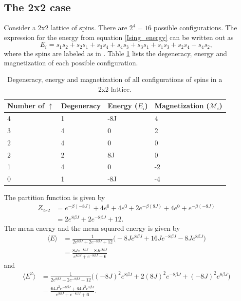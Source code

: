 \documentclass[notitlepage, reprint, nofootinbib]{revtex4-1}
\begin{document}
\subsection{The 2x2 case}
Consider a 2x2 lattice of spins. There are $2^4=16$ possible configurations. The expression for the energy from equation \ref{Ising_energy} can be written out as 
\begin{equation}\label{Ising_energy_2x2}E_i = s_1s_2+s_2s_1+s_3s_4+s_4s_3+s_3s_1+s_1s_3+s_2s_4+s_4s_2,\end{equation}
where the spins are labeled as in {\color{red}{figure}}. Table \ref{2x2_table} lists the degeneracy, energy and magnetization of each possible configuration. 
\begin{table}[]
\centering
\begin{tabular}{|l|l|l|l|}
\hline
Number of $\uparrow$ & Degeneracy & Energy ($E_i$) & Magnetization ($\mathcal{M}_i$) \\ \hline
4 & 1 & -8J & 4 \\ \hline
3 & 4 & 0 & 2 \\ \hline
2 & 4 & 0 & 0 \\ \hline
2 & 2 & 8J & 0 \\ \hline
1 & 4 & 0 & -2 \\ \hline
0 & 1 & -8J & -4 \\ \hline
\end{tabular}
\caption{Degeneracy, energy and magnetization of all configurations of spins in a 2x2 lattice.}
\label{2x2_table}
\end{table}
The partition function is given by 
\begin{align*}
	Z_{2x2}&=e^{-\beta(-8J)}+4e^0+4e^0+2e^{-\beta(8J)}+4e^0+e^{-\beta(-8J)}\\
	&= 2e^{8\beta J}+2e^{-8\beta J}+12.
\end{align*}
The mean energy and the mean squared energy is given by 
\begin{align*}
	\langle E\rangle&=\frac{1}{2e^{8\beta J}+2e^{-8\beta J}+12}\Big(-8Je^{8\beta J}+16Je^{-8\beta J}-8Je^{8\beta J}\Big)\\
	&=\frac{8Je^{-8\beta J} - 8Je^{8\beta J}}{e^{8\beta J}+e^{-8\beta J}+6}
\end{align*}
and 
\begin{align*}
	\langle E^2\rangle &=\frac{1}{2e^{8\beta J}+2e^{-8\beta J}+12}\Big((-8J)^2e^{8\beta J}+2(8J)^2e^{-8\beta J}+(-8J)^2e^{8\beta J}\Big)\\
	&=\frac{64J^2e^{-8\beta J} + 64J^2e^{8\beta J}}{e^{8\beta J}+e^{-8\beta J}+6}.
\end{align*}
\end{document}

